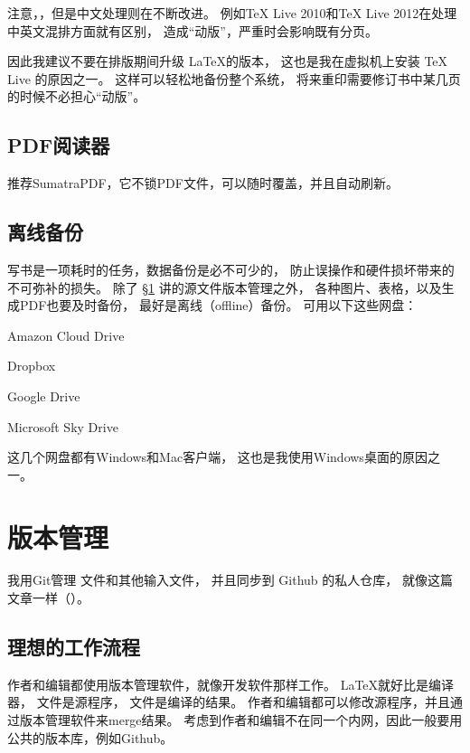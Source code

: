 注意，，但是中文处理则在不断改进。
例如TeX Live 2010和TeX Live 2012在处理中英文混排方面就有区别，
造成“动版”，严重时会影响既有分页。

\vspace{1ex}
\centerline{}

\vspace{1ex}
\centerline{}

\vspace{1ex}
因此我建议不要在排版期间升级 \LaTeX 的版本，
这也是我在虚拟机上安装 TeX Live 的原因之一。
这样可以轻松地备份整个系统，
将来重印需要修订书中某几页的时候不必担心“动版”。

\subsection{PDF阅读器}
推荐SumatraPDF，它不锁PDF文件，可以随时覆盖，并且自动刷新。

\subsection{离线备份}
写书是一项耗时的任务，数据备份是必不可少的，
防止误操作和硬件损坏带来的不可弥补的损失。
除了 \S \ref{sec:versionControl} 讲的源文件版本管理之外，
各种图片、表格，以及生成PDF也要及时备份，
最好是离线（offline）备份。
可用以下这些网盘：

\begindot
\item Amazon Cloud Drive
\item Dropbox
\item Google Drive
\item Microsoft Sky Drive
\myenddot

这几个网盘都有Windows和Mac客户端，
这也是我使用Windows桌面的原因之一。

\section{版本管理}
\label{sec:versionControl}


我用Git管理  文件和其他输入文件，
并且同步到 Github 的私人仓库，
就像这篇文章一样（）。

\subsection{理想的工作流程}
作者和编辑都使用版本管理软件，就像开发软件那样工作。
\LaTeX 就好比是编译器，
 文件是源程序，
 文件是编译的结果。
作者和编辑都可以修改源程序，并且通过版本管理软件来merge结果。
考虑到作者和编辑不在同一个内网，因此一般要用公共的版本库，例如Github。

